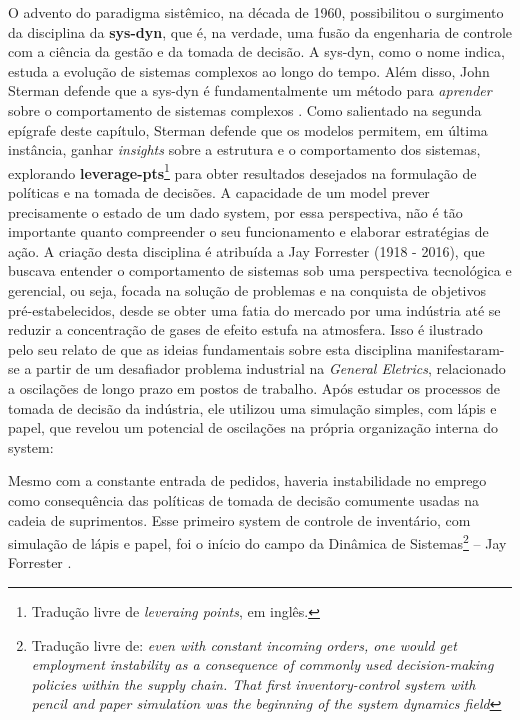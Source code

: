 \documentclass[./main.tex]{subfiles}
\begin{document}
\par O advento do \gls{paradigma} sistêmico, na década de 1960, possibilitou o surgimento da disciplina da \textbf{\gls{sys-dyn}}, que é, na verdade, uma fusão da engenharia de controle com a ciência da gestão e da tomada de decisão. A \gls{sys-dyn}, como o nome indica, estuda a evolução de sistemas complexos ao longo do tempo. Além disso, John Sterman defende que a \gls{sys-dyn} é fundamentalmente um método para \textit{aprender} sobre o comportamento de sistemas complexos \cite{sterman2000}. Como salientado na segunda epígrafe deste capítulo, Sterman defende que os modelos permitem, em última instância, ganhar \textit{insights} sobre a estrutura e o comportamento dos sistemas, explorando \textbf{\gls{leverage-pts}}\footnote{Tradução livre de \textit{leveraing points}, em inglês.} para obter resultados desejados na formulação de políticas e na tomada de decisões. A capacidade de um \gls{model} prever precisamente o estado de um dado \gls{system}, por essa perspectiva, não é tão importante quanto compreender o seu funcionamento e elaborar estratégias de ação. A criação desta disciplina é atribuída a Jay Forrester (1918 - 2016), que buscava entender o comportamento de sistemas sob uma perspectiva tecnológica e gerencial, ou seja, focada na solução de problemas e na conquista de objetivos pré-estabelecidos, desde se obter uma fatia do mercado por uma indústria até se reduzir a concentração de gases de efeito estufa na atmosfera. Isso é ilustrado pelo seu relato de que as ideias fundamentais sobre esta disciplina manifestaram-se a partir de um desafiador problema industrial na \textit{General Eletrics}, relacionado a oscilações de longo prazo em postos de trabalho. Após estudar os processos de tomada de decisão da indústria, ele utilizou uma simulação simples, com lápis e papel, que revelou um potencial de oscilações na própria organização interna do \gls{system}:

\begin{adjustwidth}{100pt}{0pt}
\medskip
\small Mesmo com a constante entrada de pedidos, haveria instabilidade no emprego como consequência das políticas de tomada de decisão comumente usadas na cadeia de suprimentos. Esse primeiro \gls{system} de controle de inventário, com simulação de lápis e papel, foi o início do campo da Dinâmica de Sistemas\footnote{Tradução livre de: \textit{even with constant incoming orders, one would get employment instability as a consequence of commonly used decision-making policies within the supply chain. That ﬁrst inventory-control system with pencil and paper simulation was the beginning of the system dynamics ﬁeld}} – Jay Forrester \cite{forrester2007}.
\medskip
\end{adjustwidth}
\end{document}
